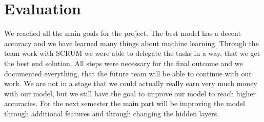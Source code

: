 
\chapter{Evaluation}
We reached all the main goals for the project. The best model has a decent accuracy and we have learned many things about machine learning. Through the team work with SCRUM we were able to delegate the tasks in a way, that we get the best end solution. All steps were necessary for the final outcome and we documented everything, that the future team will be able to continue with our work. We are not in a stage that we could actually really earn very much money with our model, but we still have the goal to improve our model to reach higher accuracies. For the next semester the main part will be improving the model through additional features and through changing the hidden layers.

